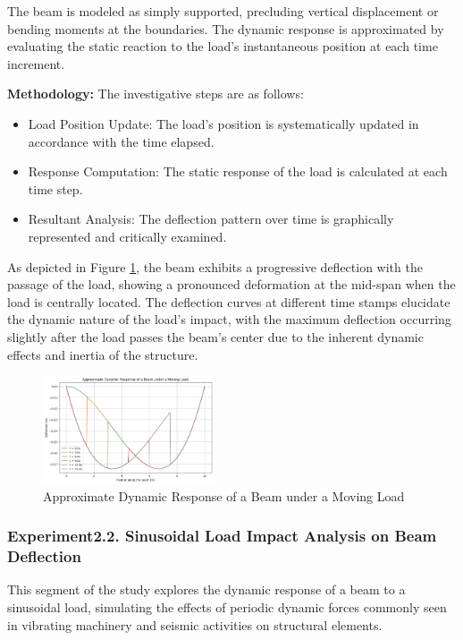 \documentclass[conference]{IEEEtran}
\begin{document}
The beam is modeled as simply supported, precluding vertical displacement or bending moments at the boundaries. The dynamic response is approximated by evaluating the static reaction to the load's instantaneous position at each time increment.

\textbf{Methodology:} The investigative steps are as follows:
\begin{itemize}
    \item Load Position Update: The load's position is systematically updated in accordance with the time elapsed.
    \item Response Computation: The static response of the load is calculated at each time step.
    \item Resultant Analysis: The deflection pattern over time is graphically represented and critically examined.
\end{itemize}

As depicted in Figure \ref{fig:beam_deflection}, the beam exhibits a progressive deflection with the passage of the load, showing a pronounced deformation at the mid-span when the load is centrally located. The deflection curves at different time stamps elucidate the dynamic nature of the load's impact, with the maximum deflection occurring slightly after the load passes the beam's center due to the inherent dynamic effects and inertia of the structure.

\begin{figure}[ht]
    \centering
    \includegraphics[width=0.45\textwidth]{4.png}
    \caption{Approximate Dynamic Response of a Beam under a Moving Load}
    \label{fig:beam_deflection}
\end{figure}

\subsubsection{Experiment2.2. Sinusoidal Load Impact Analysis on Beam Deflection}
This segment of the study explores the dynamic response of a beam to a sinusoidal load, simulating the effects of periodic dynamic forces commonly seen in vibrating machinery and seismic activities on structural elements.
\end{document}
